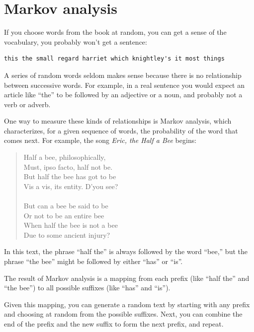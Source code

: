 \documentclass[10pt]{book}
\begin{document}
\section{Markov analysis}


If you choose words from the book at random, you can get a
sense of the vocabulary, you probably won't get a sentence:

\beforeverb
\begin{verbatim}
this the small regard harriet which knightley's it most things
\end{verbatim}
\afterverb
%
A series of random words seldom makes sense because there
is no relationship between successive words.  For example, in
a real sentence you would expect an article like ``the'' to
be followed by an adjective or a noun, and probably not a verb
or adverb.

One way to measure these kinds of relationships is Markov
analysis, which characterizes, for a given sequence of words,
the probability of the word that comes next.  For example,
the song {\em Eric, the Half a Bee} begins:

\begin{quote}
Half a bee, philosophically, \\
Must, ipso facto, half not be. \\
But half the bee has got to be \\
Vis a vis, its entity. D'you see? \\
\\
But can a bee be said to be \\
Or not to be an entire bee \\
When half the bee is not a bee \\
Due to some ancient injury? \\
\end{quote}
%
In this text,
the phrase ``half the'' is always followed by the word ``bee,''
but the phrase ``the bee'' might be followed by either
``has'' or ``is''.


The result of Markov analysis is a mapping from each prefix
(like ``half the'' and ``the bee'') to all possible suffixes
(like ``has'' and ``is'').


Given this mapping, you can generate a random text by
starting with any prefix and choosing at random from the
possible suffixes.  Next, you can combine the end of the
prefix and the new suffix to form the next prefix, and repeat.
\end{document}
